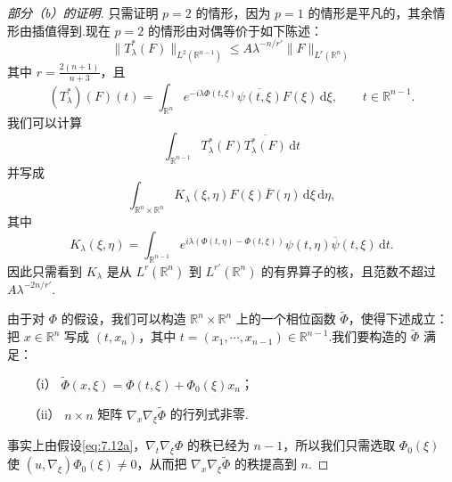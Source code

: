 \documentclass[
  BookTitleCN={傅里叶分析中的振动积分},
  BookTitleEN={Oscillatory Integrals in Fourier Analysis},
  OriginalAuthor={E.~M. Stein},
  OriginalEdition={Proc. Sympos. Pure Math. 35, Part~1},
  OriginalPublisher={American Mathematical Society},
  OriginalYear={1979},
  Translator={翻译及重排},
  ModelUsed={Codex CLI},
  Biblatex=false,
  TranslationDate={2026年8月27日}
]{mathtranslation}
\numberwithin{equation}{chapter}   %
\newcommand{\R}{\mathbb{R}}
\begin{document}
\begin{proof}[部分（b）的证明]
  只需证明 $p=2$ 的情形，因为 $p=1$ 的情形是平凡的，其余情形由插值得到.现在 $p=2$ 的情形由对偶等价于如下陈述：
  \begin{equation}
    \|T_{\lambda}^{*}(F)\|_{L^{2}(\R^{n-1})}\leq A\lambda^{-n/r'}\|F\|_{L^{r}(\R^{n})} \label{eq:7.14}
  \end{equation}
  其中 $r=\frac{2(n+1)}{n+3}$，且
  \[
    (T_{\lambda}^{*})(F)(t)=\int_{\R^{n}}e^{-i\lambda\Phi(t,\xi)}\overline{\psi(t,\xi)}F(\xi)\,\mathrm{d}\xi,\qquad t\in\R^{n-1} .
  \]
  我们可以计算
  \[
    \int_{\R^{n-1}}T_{\lambda}^{*}(F)\overline{T_{\lambda}^{*}(F)}\,\mathrm{d}t
  \]
  并写成
  \[
    \int_{\R^{n}\times\R^{n}}K_{\lambda}(\xi,\eta)F(\xi)\overline{F}(\eta)\,\mathrm{d}\xi\,\mathrm{d}\eta,
  \]
  其中
  \begin{equation}
    K_{\lambda}(\xi,\eta)=\int_{\R^{n-1}}e^{i\lambda(\Phi(t,\eta)-\Phi(t,\xi))}\psi(t,\eta)\overline{\psi}(t,\xi)\,\mathrm{d}t . \label{eq:7.15}
  \end{equation}
  因此只需看到 $K_{\lambda}$ 是从 $L^{r}(\R^{n})$ 到 $L^{r'}(\R^{n})$ 的有界算子的核，且范数不超过 $A\lambda^{-2n/r'}$.

  由于对 $\Phi$ 的假设，我们可以构造 $\R^{n}\times\R^{n}$ 上的一个相位函数 $\widetilde{\Phi}$，使得下述成立：把 $x\in\R^{n}$ 写成 $(t,x_{n})$，其中 $t=(x_{1},\cdots,x_{n-1})\in\R^{n-1}$.我们要构造的 $\widetilde{\Phi}$ 满足：
  \begin{enumerate}
    \item[（i）] $\widetilde{\Phi}(x,\xi)=\Phi(t,\xi)+\Phi_{0}(\xi)x_{n}$；
    \item[（ii）] $n\times n$ 矩阵 $\nabla_{x}\nabla_{\xi}\widetilde{\Phi}$ 的行列式非零.
  \end{enumerate}
  事实上由假设\eqref{eq:7.12a}，$\nabla_{t}\nabla_{\xi}\Phi$ 的秩已经为 $n-1$，所以我们只需选取 $\Phi_{0}(\xi)$ 使 $(u,\nabla_{\xi})\Phi_{0}(\xi)\neq0$，从而把 $\nabla_{x}\nabla_{\xi}\widetilde{\Phi}$ 的秩提高到 $n$.


\end{proof}
\end{document}
